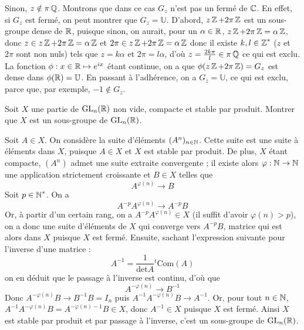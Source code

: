 \begin{solution}
    Sinon, $z\notin\pi\operatorname{\mathbb Q}$. Montrons que dans ce cas $G_z$ n'est pas un fermé de $\operatorname{\mathbb C}$.
    En effet, si $G_z$ est fermé, on peut montrer que $G_z=\mathbb U$. 
    D'abord, $z\operatorname{\mathbb Z}+2\pi\operatorname{\mathbb Z}$ est un sous-groupe dense de $\operatorname{\mathbb R}$, puisque sinon, 
    on aurait, pour un $\alpha\in\operatorname{\mathbb R}$, $z\operatorname{\mathbb Z}+2\pi\operatorname{\mathbb Z}=\alpha\operatorname{\mathbb Z}$, donc $z\in z\operatorname{\mathbb Z}+2\pi\operatorname{\mathbb Z}=\alpha\operatorname{\mathbb Z}$
    et $2\pi\in z\operatorname{\mathbb Z}+2\pi\operatorname{\mathbb Z}=\alpha\operatorname{\mathbb Z}$ donc il existe $k,l\in\operatorname{\mathbb Z}^*$ ($z$ et $2\pi$ sont non nuls) 
    tels que $z=k\alpha$ et $2\pi=l\alpha$, d'où $z=\frac{2k\pi}l\in\pi\operatorname{\mathbb Q}$ ce qui est exclu. 
    La fonction $\phi:x\in\operatorname{\mathbb R}\mapsto e^{ix}$ étant continue, on a que $\phi(z\operatorname{\mathbb Z}+2\pi\operatorname{\mathbb Z})=G_z$ est dense dans $\phi(\operatorname{\mathbb R})=\mathbb U$. 
    En passant à l'adhérence, on a $G_z=\mathbb U$, ce qui est exclu, parce que, par exemple, $-1\notin G_z$.
\end{solution}

\begin{exo}
    \label{evn2}
    Soit $X$ une partie de $\operatorname{GL}_n(\operatorname{\mathbb R})$ non vide, compacte et stable par produit. Montrer que $X$ est un sous-groupe de $\operatorname{GL}_n(\operatorname{\mathbb R})$.
\end{exo}

\begin{solution}
    Soit $A\in X$. On considère la suite d'éléments $(A^n)_{n\in\operatorname{\mathbb N}}$.
    Cette suite est une suite à éléments dans $X$, puisque $A\in X$ et $X$ est stable par produit. 
    De plus, $X$ étant compacte, $(A^n)$ admet une suite extraite convergente ; 
    il existe alors $\varphi : \operatorname{\mathbb N}\to\operatorname{\mathbb N}$ une application strictement croissante et $B\in X$ telles que \[A^{\varphi(n)}\longrightarrow B\]
    Soit $p\in\operatorname{\mathbb N}^*$. On a \[A^{-p}A^{\varphi(n)}\longrightarrow A^{-p}B\]
    Or, à partir d'un certain rang, on a $A^{-p}A^{\varphi(n)}\in X$ (il suffit d'avoir $\varphi(n)>p$), 
    on a donc une suite d'éléments de $X$ qui converge vers $A^{-p}B$, matrice qui est alors dans $X$ puisque $X$ est fermé. 
    Ensuite, sachant l'expression suivante pour l'inverse d'une matrice : \[A^{-1}=\frac1{\text{det}A}{}^t\text{Com}(A)\]
    on en déduit que le passage à l'inverse est continu, d'où que \[A^{-\varphi(n)}\longrightarrow B^{-1}\]
    Donc $A^{-\varphi(n)}B\longrightarrow B^{-1}B=I_n$ puis $A^{-1}A^{-\varphi(n)}B\longrightarrow A^{-1}$. 
    Or, pour tout $n\in\operatorname{\mathbb N}$, $A^{-1}A^{-\varphi(n)}B=A^{-\varphi(n)-1}B \in X$, donc $A^{-1}\in X$ puisque $X$ est fermé. 
    Ainsi $X$ est stable par produit et par passage à l'inverse, c'est un sous-groupe de $\operatorname{GL}_n(\operatorname{\mathbb R})$.
\end{solution}
    
